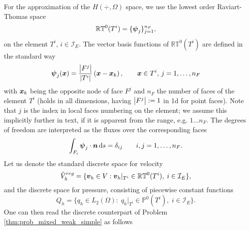 For the approximation of the $H(\div,\Omega)$ space, we use the lowest order Raviart-Thomas space
\begin{equation}
    \mathbb{RT}^0(T^i) = \{\mathbf{\boldsymbol{\psi}}_j\}_{j=1}^{n_F}, 
\end{equation}
on the element $T^i$, $i\in\mathcal{I}_E$. The vector basis functions of $\mathbb{RT}^0(T^i)$
are defined in the standard way
\begin{equation}
    \mathbf{\boldsymbol{\psi}}_j(\mathbf{\boldsymbol{x}}) = \frac{\left|F^j\right|}{\left|T^i\right|} \left( \mathbf{\boldsymbol{x}} - \mathbf{\boldsymbol{x}}_k \right), \qquad \mathbf{\boldsymbol{x}}\in T^i,\, j=1,\ldots,n_F
\end{equation}
with $\mathbf{\boldsymbol{x}}_k$ being the opposite node of face $F^j$ and $n_F$ the number of faces of the element $T^i$
(holds in all dimensions, having $\left|F^j\right|:=1$ in 1d for point faces).
Note that $j$ is the index in local faces numbering on the element; we assume this implicitly further in text, 
if it is apparent from the range, e.g. $1\ldots n_F$.
The degrees of freedom are interpreted as the fluxes over the corresponding faces
\begin{equation} \label{eqn:rt0_delta_property}
    \int_{F_i} \mathbf{\boldsymbol{\psi}}_j \cdot \mathbf{\boldsymbol{n}} \,{\rm d} s = \delta_{ij} \qquad i,j=1,\ldots,n_F.
\end{equation}
Let us denote the standard discrete space for velocity
\begin{equation}
    \tilde V_h^{reg} = \{\mathbf{\boldsymbol{v}}_h\in V: \mathbf{\boldsymbol{v}}_h|_{T^i} \in \mathbb{RT}^0(T^i),\; i\in\mathcal{I}_E \},
\end{equation}
and the discrete space for pressure, consisting of piecewise constant functions
\begin{equation}
    Q_h=\{q_h\in L_2(\Omega):\; q_h|_{T^i}\in \mathbb{P}^0(T^i),\; i\in\mathcal{I}_E\}.
\end{equation}
One can then read the discrete counterpart of Problem \ref{thm:prob_mixed_weak_simple} as follows

